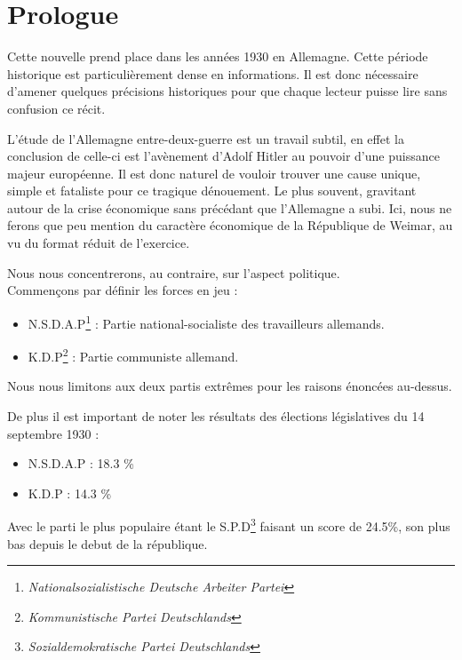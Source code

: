 \part*{Prologue}

\raggedright

Cette nouvelle prend place dans les années 1930 en Allemagne.
Cette période historique est particulièrement dense en informations.
Il est donc nécessaire d'amener quelques précisions historiques pour que chaque lecteur puisse lire sans confusion ce récit.\\

\bigskip

L'étude de l'Allemagne entre-deux-guerre est un travail subtil, 
en effet la conclusion de celle-ci est l'avènement d'Adolf Hitler au pouvoir d'une puissance majeur européenne.
Il est donc naturel de vouloir trouver une cause unique, simple et fataliste pour ce tragique dénouement.
Le plus souvent, gravitant autour de la crise économique sans précédant que l'Allemagne a subi. 
Ici, nous ne ferons que peu mention du caractère économique de la République de Weimar, au vu du format réduit de l'exercice.

Nous nous concentrerons, au contraire, sur l'aspect politique.\\
\medskip
Commençons par définir les forces en jeu :

\begin{itemize}
    \item N.S.D.A.P\footnote{\textit{Nationalsozialistische Deutsche Arbeiter Partei}} : Partie national-socialiste des travailleurs allemands.
    \item K.D.P\footnote{\textit{Kommunistische Partei Deutschlands}} : Partie communiste allemand.
\end{itemize}
\medskip

Nous nous limitons aux deux partis extrêmes pour les raisons énoncées au-dessus.\\
\bigskip

De plus il est important de noter les résultats des élections législatives du 14 septembre 1930 :

\begin{itemize}
    \item N.S.D.A.P : 18.3 \%
    \item K.D.P : 14.3 \%
\end{itemize}
\medskip
Avec le parti le plus populaire étant le S.P.D\footnote{\textit{Sozialdemokratische Partei Deutschlands}} faisant un score de 24.5\%, son plus bas depuis le debut de la république.
\bigskip

